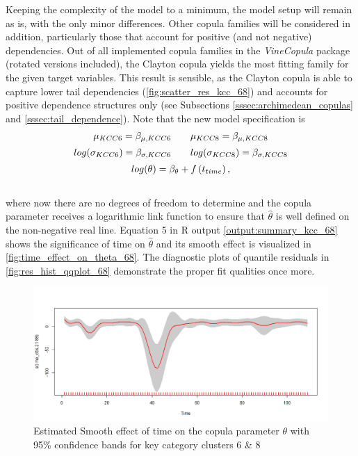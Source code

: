 Keeping the complexity of the model to a minimum, the model setup will remain as is, with the only minor differences. Other copula families will be considered in addition, particularly those that account for positive (and not negative) dependencies. Out of all implemented copula families in the \textit{VineCopula} package (rotated versions included), the Clayton copula yields the most fitting family for the given target variables. This result is sensible, as the Clayton copula is able to capture lower tail dependencies (\autoref{fig:scatter_res_kcc_68}) and accounts for positive dependence structures only (see Subsections \ref{sssec:archimedean_copulas} and \ref{sssec:tail_dependence}). Note that the new model specification is \\

\begin{equation}
\begin{array}{c}
\mu_{KCC 6}=\beta_{\mu,KCC6} \qquad \mu_{KCC 8}=\beta_{\mu,KCC8}  \\  \noalign{\vskip5pt}

log(\sigma_{KCC 6})=\beta_{\sigma,KCC6} \qquad log(\sigma_{KCC 8})=\beta_{\sigma,KCC8} \\  \noalign{\vskip5pt}


log(\theta)=\beta_{\theta}+f\left(t_{time}\right),
\end{array}
\label{eq:gjrm_formula_68}
\end{equation}
\\

where now there are no degrees of freedom to determine and the copula parameter receives a logarithmic link function to ensure that $\hat{\theta}$ is well defined on the non-negative real line. Equation 5 in R output \ref{output:summary_kcc_68} shows the significance of time on $\hat{\theta}$ and its smooth effect is visualized in \autoref{fig:time_effect_on_theta_68}. The diagnostic plots of quantile residuals in \autoref{fig:res_hist_qqplot_68} demonstrate the proper fit qualities once more.
\\




\begin{figure}[H]
\centering
  \includegraphics[width=0.95\linewidth]{figures/time_effect_on_theta_68.png}
  \caption{Estimated Smooth effect of time on the copula parameter $\theta$ with 95\% confidence bands for key category clusters 6 \& 8}
  \label{fig:time_effect_on_theta_68}
\end{figure}




